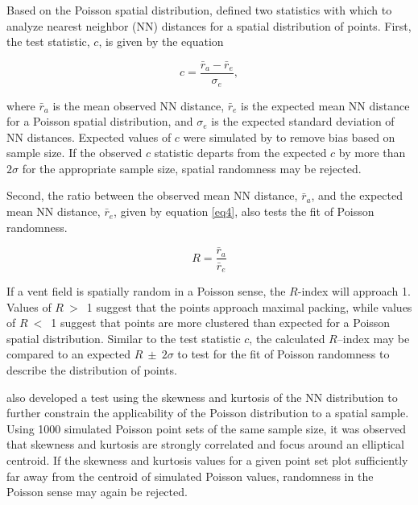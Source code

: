\documentclass[preprint,review,authoryear,12pt]{elsarticle}
\begin{document}
Based on the Poisson spatial distribution, \citet{Clark1954} defined two statistics with which to analyze nearest neighbor (NN) distances for a spatial distribution of points. First, the test statistic, $c$, is given by the equation \begin{linenomath*}\begin{equation}
c= \frac{\bar{r}_a -\bar{r}_e}{\sigma_e},  \label{eq3}
\end{equation}\end{linenomath*}where $\bar{r}_a$ is the mean observed NN distance, $\bar{r}_e$ is the expected mean NN distance for a Poisson spatial distribution, and $\sigma_e$ is the expected standard deviation of NN distances. Expected values of $c$ were simulated by \citet{Baloga2007} to remove bias based on sample size. If the observed $c$ statistic departs from the expected $c$ by more than $2\sigma$ for the appropriate sample size, spatial randomness may be rejected.

Second, the ratio between the observed mean NN distance, $\bar{r}_a$, and the expected mean NN distance, $\bar{r}_e$, given by equation \ref{eq4}, also tests the fit of Poisson randomness.\begin{linenomath*}\begin{equation}
R = \frac{\bar{r}_a}{\bar{r}_e} \label{eq4}
\end{equation}\end{linenomath*}
If a vent field is spatially random in a Poisson sense, the $R$-index will approach 1. Values of $R~>$~1 suggest that the points approach maximal packing, while values of $R~<$~1 suggest that points are more clustered than expected for a Poisson spatial distribution. Similar to the test statistic $c$, the calculated $R$--index may be compared to an expected $R~\pm~2\sigma$ to test for the fit of Poisson randomness to describe the distribution of points.

\citet{Baloga2007} also developed a test using the skewness and kurtosis of the NN distribution to further constrain the applicability of the Poisson distribution to a spatial sample. Using 1000 simulated Poisson point sets of the same sample size, it was observed that skewness and kurtosis are strongly correlated and focus around an elliptical centroid.  If the skewness and kurtosis values for a given point set plot sufficiently far away from the centroid of simulated Poisson values, randomness in the Poisson sense may again be rejected.
\end{document}
